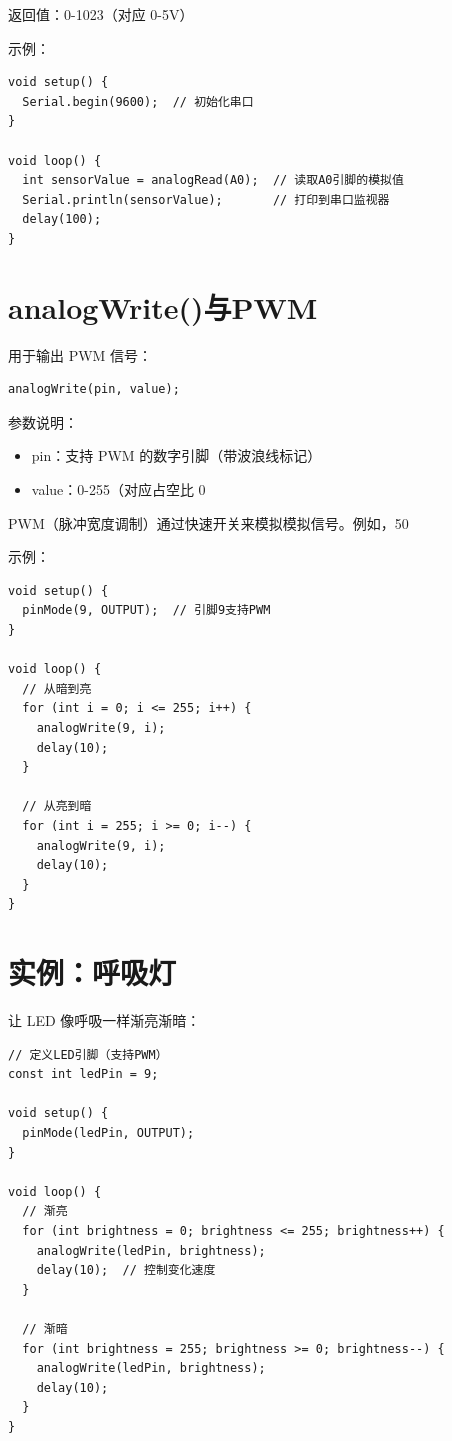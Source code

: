\documentclass[12pt,UTF8]{ctexbook}
\begin{document}
返回值：0-1023（对应 0-5V）

示例：
\begin{lstlisting}
void setup() {
  Serial.begin(9600);  // 初始化串口
}

void loop() {
  int sensorValue = analogRead(A0);  // 读取A0引脚的模拟值
  Serial.println(sensorValue);       // 打印到串口监视器
  delay(100);
}
\end{lstlisting}

\section{analogWrite()与PWM}

用于输出 PWM 信号：

\begin{lstlisting}
analogWrite(pin, value);
\end{lstlisting}

参数说明：
\begin{itemize}
    \item pin：支持 PWM 的数字引脚（带波浪线标记）
    \item value：0-255（对应占空比 0%
\end{itemize}

PWM（脉冲宽度调制）通过快速开关来模拟模拟信号。例如，50%

示例：
\begin{lstlisting}
void setup() {
  pinMode(9, OUTPUT);  // 引脚9支持PWM
}

void loop() {
  // 从暗到亮
  for (int i = 0; i <= 255; i++) {
    analogWrite(9, i);
    delay(10);
  }
  
  // 从亮到暗
  for (int i = 255; i >= 0; i--) {
    analogWrite(9, i);
    delay(10);
  }
}
\end{lstlisting}

\section{实例：呼吸灯}

让 LED 像呼吸一样渐亮渐暗：

\begin{lstlisting}
// 定义LED引脚（支持PWM）
const int ledPin = 9;

void setup() {
  pinMode(ledPin, OUTPUT);
}

void loop() {
  // 渐亮
  for (int brightness = 0; brightness <= 255; brightness++) {
    analogWrite(ledPin, brightness);
    delay(10);  // 控制变化速度
  }
  
  // 渐暗
  for (int brightness = 255; brightness >= 0; brightness--) {
    analogWrite(ledPin, brightness);
    delay(10);
  }
}
\end{lstlisting}
\end{document}
